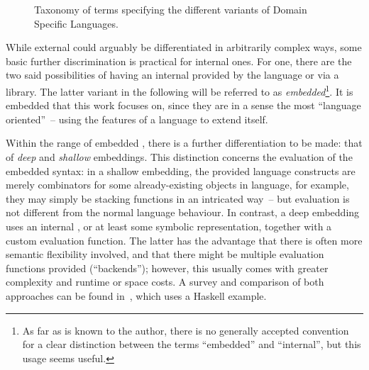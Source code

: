 \begin{figure}
  \centering\sffamily
  \caption{Taxonomy of terms specifying the different variants of Domain Specific
    Languages.\label{fig:dslterms}}
\end{figure}

While external \dsls{} could arguably be differentiated in arbitrarily complex ways, some basic
further discrimination is practical for internal ones. For one, there are the two said possibilities
of having an internal \dsl{} provided by the language or via a library. The latter variant in the
following will be referred to as \emph{embedded}\footnote{As far as is known to the author, there is no
generally accepted convention for a clear distinction between the terms \enquote{embedded} and
\enquote{internal}, but this usage seems useful.}. It is embedded \dsls {} that this work focuses on,
since they are in a sense the most \enquote{language oriented}~-- using the features of a language
to extend itself.

Within the range of embedded \dsls{}, there is a further differentiation to be made: that of
\emph{deep} and \emph{shallow} embeddings. This distinction concerns the evaluation of the embedded
syntax: in a shallow embedding, the provided language constructs are merely combinators for some
already-existing objects in language, for example, they may simply be stacking functions in an
intricated way~-- but evaluation is not different from the normal language behaviour. In contrast, a
deep embedding uses an internal , or at least some symbolic representation, together
with a custom evaluation function. The latter has the advantage that there is often more semantic
flexibility involved, and that there might be multiple evaluation functions provided
(\enquote{backends}); however, this usually comes with greater complexity and runtime or space
costs. A survey and comparison of both approaches can be found in~\cite{gibbons2014:folding}, which
uses a Haskell example.


